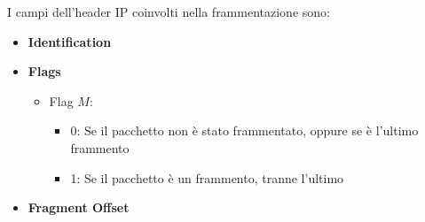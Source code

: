 \documentclass[a4paper]{article}
\begin{document}
\vspace{1em}
\noindent
I campi dell'header IP coinvolti nella frammentazione sono:
\begin{itemize}
  \item \textbf{Identification}
  \item \textbf{Flags}
    \begin{itemize}
      \item Flag \( M \):
        \begin{itemize}
          \item 0: Se il pacchetto non è stato frammentato, oppure se è l'ultimo
            frammento
          \item 1: Se il pacchetto è un frammento, tranne l'ultimo
        \end{itemize}
    \end{itemize}
  \item \textbf{Fragment Offset}
\end{itemize}
\end{document}
